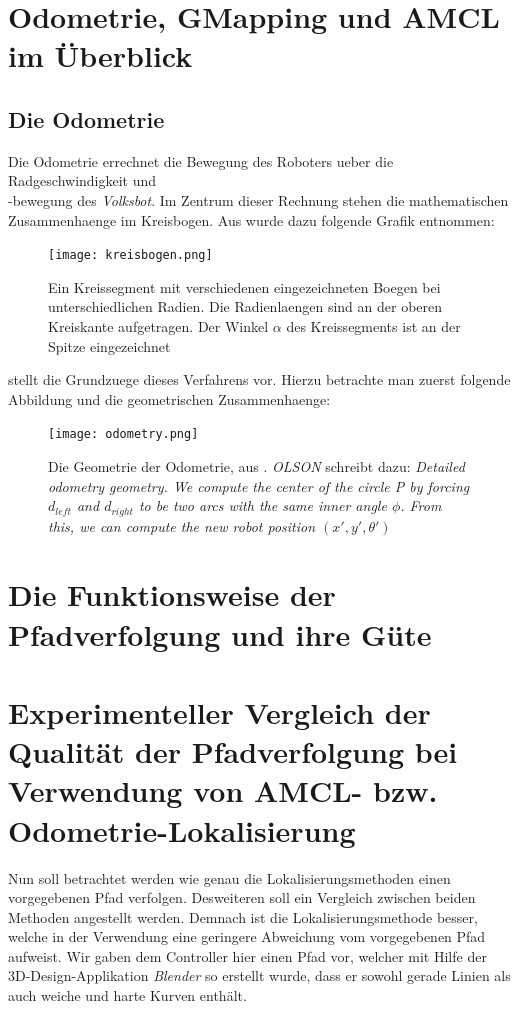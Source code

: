 \documentclass[11pt,a4paper]{article}
\begin{document}
\section{Odometrie, GMapping und AMCL im Überblick}
\subsection*{Die Odometrie}
Die Odometrie errechnet die Bewegung des Roboters ueber die Radgeschwindigkeit und \\ -bewegung 
des \textit{Volksbot}. Im Zentrum dieser Rechnung stehen die mathematischen Zusammenhaenge im Kreisbogen. 
Aus \cite{website:dresden} wurde dazu folgende Grafik entnommen:

\begin{figure}[ht]
  \centering
  \texttt{[image: kreisbogen.png]}
  \caption{Ein Kreissegment mit verschiedenen eingezeichneten Boegen bei unterschiedlichen Radien. Die Radienlaengen sind an der oberen Kreiskante 
  aufgetragen. Der Winkel $\alpha$ des Kreissegments ist an der Spitze eingezeichnet}
  \label{fig: Kreissegment}
\end{figure}


\cite{olson2004primer} stellt die Grundzuege dieses Verfahrens vor. Hierzu betrachte man zuerst folgende 
Abbildung und die geometrischen Zusammenhaenge:

\begin{figure}[ht]
  \centering
  \texttt{[image: odometry.png]}
  \caption{Die Geometrie der Odometrie, aus \cite{olson2004primer}. \textit{OLSON} schreibt dazu: \textit{ Detailed odometry geometry. 
  We compute the center of the circle P by forcing $d_{left}$ and $d_{right}$ to be two arcs with the same inner angle $\phi$.
  From this, we can compute the new robot position $(x', y', \theta')$}}
  \label{fig: Odometrie}
\end{figure}



\section{Die Funktionsweise der Pfadverfolgung und ihre Güte}

\section{Experimenteller Vergleich der Qualität der Pfadverfolgung bei Verwendung von AMCL-  bzw. Odometrie-Lokalisierung}
Nun soll betrachtet werden wie genau die Lokalisierungsmethoden einen vorgegebenen Pfad verfolgen. Desweiteren soll ein Vergleich zwischen beiden Methoden angestellt werden. 
Demnach ist die Lokalisierungsmethode besser, welche in der Verwendung eine geringere Abweichung vom vorgegebenen Pfad aufweist. 
Wir gaben dem Controller hier einen Pfad vor, welcher mit Hilfe der 3D-Design-Applikation \textit{Blender} so erstellt wurde, dass er sowohl
gerade Linien als auch weiche und harte Kurven enthält.
\end{document}
